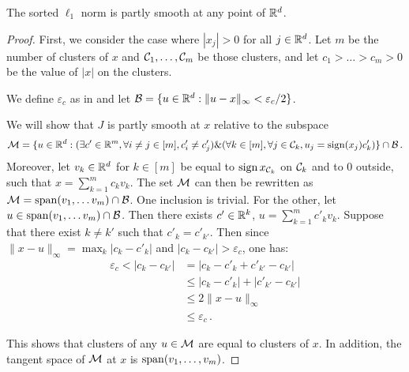 \begin{proposition}
  The sorted $\ell_1$ norm is partly smooth at any point of $\mathbb{R}^d$.
\end{proposition}

\begin{proof}

  First, we consider the case where $| x_j| >0$ for all $j\in\mathbb{R}^d$.
  Let $m$ be the number of clusters of $x$ and $\mathcal{C}_1, \ldots, \mathcal{C}_m$ be those clusters, and let $c_1 > \ldots > c_m > 0$ be the  value of  $\lvert x \rvert$ on the clusters.

  We define $\varepsilon_c$ as in  and 
  let $\mathcal{B} = \{u \in \mathbb{R}^d: \lVert u - x \rVert_\infty < \varepsilon_c / 2\}$.
  
  We will show that $J$ is partly smooth at $x$ relative to the subspace
  \begin{equation}
    \mathcal{M} = \{ u \in \mathbb{R}^d : (\exists c' \in \mathbb{R}^m, \forall i \neq j \in [m], c'_i \neq c'_j) \& (\forall k \in [m], \forall j \in \mathcal{C}_k, u_j = \operatorname{sign}(x_j) c'_k) \} \cap \mathcal{B} \, .
  \end{equation}
  Moreover, let $v_k \in \mathbb{R}^d$ for $k \in [m]$  be equal to $\operatorname{sign} x_{\mathcal{C}_k}$ on $\mathcal{C}_k$ and to 0 outside, such that $x = \sum_{k=1}^m c_k v_k$.
  The set $\mathcal{M}$ can then be rewritten as $\mathcal{M} = \operatorname{span}(v_1, \ldots v_m) \cap \mathcal{B}$.
  One inclusion is trivial.
  For the other, let $u \in \operatorname{span}(v_1, \ldots v_m) \cap \mathcal{B}$.
  Then there exists $c' \in \mathbb{R}^k$, $u = \sum_{k=1}^m c'_k v_k$.
  Suppose that there exist $k \neq k'$ such that $c'_k = c'_{k'}$.
  Then since $\lVert x - u \rVert_\infty = \max_k |c_k - c'_k|$ and $|c_k - c_{k'}| > \varepsilon_c$, one has:
  \begin{align*}
     \varepsilon_c < |c_k - c_{k'}|
     &= |c_k - c'_k + c'_{k'} - c_{k'}| \\
     &\leq |c_k - c'_k| + |c'_{k'} - c_{k'}| \\
     &\leq 2 \lVert x - u \rVert_\infty \\
     &\leq  \varepsilon_c \, .
  \end{align*}

  This shows that clusters of any $u \in \mathcal{M}$ are equal to clusters of $x$.
  In addition, the tangent space of $\mathcal{M}$ at $x$ is $\operatorname{span}(v_1, \hdots, v_m)$. 
  
  


\end{proof}
